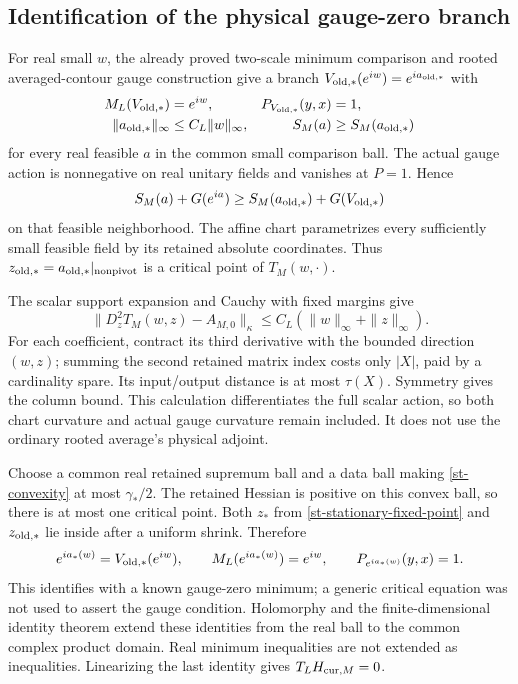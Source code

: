 \documentclass[11pt]{article}
\theoremstyle{remark}
\begin{document}
\subsection{Identification of the physical gauge-zero branch}
\label{st-identification-section}

For real small $w$, the already proved two-scale minimum comparison and
rooted averaged-contour gauge construction give a branch
$V_{{\rm old},*}(e^{iw})=e^{ia_{{\rm old},*}}$ with
\begin{align}
 M_L(V_{{\rm old},*})&=e^{iw},& P_{V_{{\rm old},*}}(y,x)&=1,\notag\\
 \|a_{{\rm old},*}\|_\infty&\le C_L\|w\|_\infty,&
 S_M(a)&\ge S_M(a_{{\rm old},*})                           \label{st-known-minimum}
\end{align}
for every real feasible $a$ in the common small comparison ball. The
actual gauge action is nonnegative on real unitary fields and vanishes
at $P=1$. Hence
\begin{equation}
 S_M(a)+G(e^{ia})\ge S_M(a_{{\rm old},*})+G(V_{{\rm old},*})
                                                               \label{st-action-comparison}
\end{equation}
on that feasible neighborhood. The affine chart parametrizes every
sufficiently small feasible field by its retained absolute coordinates.
Thus $z_{{\rm old},*}=a_{{\rm old},*}|_{\rm nonpivot}$ is a critical
point of $T_M(w,\cdot)$.

The scalar support expansion and Cauchy with fixed margins give
\begin{equation}
 \|D_z^2T_M(w,z)-A_{M,0}\|_\kappa
                \le C_L(\|w\|_\infty+\|z\|_\infty).         \label{st-convexity}
\end{equation}
For each coefficient, contract its third derivative with the bounded
direction $(w,z)$; summing the second retained matrix index costs only
$|X|$, paid by a cardinality spare. Its input/output distance is at
most $\tau(X)$. Symmetry gives the column bound. This calculation
differentiates the full scalar action, so both chart curvature and
actual gauge curvature remain included. It does not use the ordinary
rooted average's physical adjoint.

Choose a common real retained supremum ball and a data ball making
\eqref{st-convexity} at most $\gamma_*/2$. The retained Hessian is
positive on this convex ball, so there is at most one critical point.
Both $z_*$ from \eqref{st-stationary-fixed-point} and
$z_{{\rm old},*}$ lie inside after a uniform shrink. Therefore
\begin{equation}
 e^{ia_*(w)}=V_{{\rm old},*}(e^{iw}),\qquad
 M_L(e^{ia_*(w)})=e^{iw},\qquad P_{e^{ia_*(w)}}(y,x)=1.       \label{st-physical-identities}
\end{equation}
This identifies with a known gauge-zero minimum; a generic critical
equation was not used to assert the gauge condition. Holomorphy and the
finite-dimensional identity theorem extend these identities from the
real ball to the common complex product domain. Real minimum
inequalities are not extended as inequalities. Linearizing the last
identity gives $T_LH_{{\rm cur},M}=0$.
\end{document}
